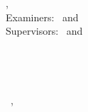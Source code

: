 \begin{titlepage}

	

\end{titlepage}


\hfill
\vfill
{
	\small
	\textbf{\thesisName} \\
	\textit{\thesisTitle} \\
	\thesisSubject, \thesisDate \\
	Examiners: \thesisFirstReviewer\ and \thesisSecondReviewer \\
	Supervisors: \thesisFirstSupervisor\ and \thesisSecondSupervisor \\[1.5em]
	\textbf{\thesisUniversity} \\
	\textit{\thesisUniversityGroup} \\
	\thesisUniversityInstitute \\
	\thesisUniversityDepartment \\
	\thesisUniversityStreetAddress\ , \thesisUniversityPostalCode\ \\
	\thesisUniversityCity
}
